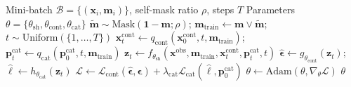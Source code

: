 \documentclass[times, review, 10pt]{elsarticle}
\newcommand{\algsmall}{\footnotesize}
\begin{document}
\begin{algorithm}[t]
\caption{MissHDD joint training with self-masking}
\label{alg:training}
\algsmall
\begin{algorithmic}[1]
\Require Mini-batch $\mathcal{B}=\{(\mathbf{x}_i,\mathbf{m}_i)\}$, self-mask ratio $\rho$, steps $T$
\Require Parameters $\theta=\{\theta_{\mathrm{sh}},\theta_{\mathrm{cont}},\theta_{\mathrm{cat}}\}$
        \State $\tilde{\mathbf{m}}\sim\mathrm{Mask}(\mathbf{1}-\mathbf{m};\rho)$;\quad
        $\mathbf{m}_{\mathrm{train}}\gets \mathbf{m}\lor\tilde{\mathbf{m}}$;\quad
        $t\sim\mathrm{Uniform}(\{1,\ldots,T\})$
        \State $\mathbf{x}^{\mathrm{cont}}_t\gets q_{\mathrm{cont}}(\mathbf{x}^{\mathrm{cont}}_0,t,\mathbf{m}_{\mathrm{train}})$;\quad
        $\mathbf{p}^{\mathrm{cat}}_t\gets q_{\mathrm{cat}}(\mathbf{p}^{\mathrm{cat}}_0,t,\mathbf{m}_{\mathrm{train}})$
        \State $\mathbf{z}_t\gets f_{\theta_{\mathrm{sh}}}(\mathbf{x}^{\mathrm{obs}},\mathbf{m}_{\mathrm{train}},
        \mathbf{x}^{\mathrm{cont}}_t,\mathbf{p}^{\mathrm{cat}}_t,t)$
        \State $\hat{\boldsymbol{\epsilon}}\gets g_{\theta_{\mathrm{cont}}}(\mathbf{z}_t)$;\quad
        $\hat{\boldsymbol{\ell}}\gets h_{\theta_{\mathrm{cat}}}(\mathbf{z}_t)$
    \EndFor
    \State $\mathcal{L}\gets \mathcal{L}_{\mathrm{cont}}(\hat{\boldsymbol{\epsilon}},\boldsymbol{\epsilon})
    +\lambda_{\mathrm{cat}}\mathcal{L}_{\mathrm{cat}}(\hat{\boldsymbol{\ell}},\mathbf{p}^{\mathrm{cat}}_0)$
    \State $\theta\gets\mathrm{Adam}(\theta,\nabla_\theta\mathcal{L})$
\EndFor
\State \Return $\theta$
\end{algorithmic}
\end{algorithm}
\end{document}
